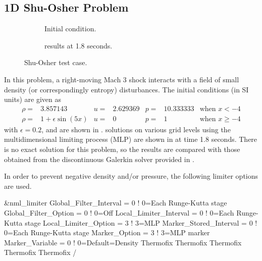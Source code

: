 \subsection{1D Shu-Osher Problem}
\label{SEC:Testcases:ShuOsher}

\begin{figure}[h!tb]
  \begin{centering}
    \begin{subfigure}{3.0in}
      \caption{Initial condition.}
      \label{FIG:ShuOsherStart}
    \end{subfigure}%
    \begin{subfigure}{3.0in}
      \caption{\PO[3] results at 1.8 seconds.}
      \label{FIG:ShuOsherFinal}
    \end{subfigure}
    \caption{Shu-Osher test case.}
    \label{FIG:ShuOsher}
  \end{centering}
\end{figure}

In this problem, a right-moving Mach 3 shock interacts with a field of
small density (or correspondingly entropy) disturbances.
%
The initial conditions (in SI units) are given as
%
\begin{align}
    \rho =& 3.857143
  & u    =& 2.629369
  & p    =& 10.333333
  & \text{when $x < -4$}
  \\
    \rho =& 1 + \epsilon \sin \left( 5 x \right)
  & u    =& 0
  & p    =& 1
  & \text{when $x \geq -4$}
\end{align}
%
with $\epsilon=0.2$, and are shown in .
%
\PO[3] solutions on various grid levels using the
multidimensional limiting process (MLP) are shown in 
at time 1.8 seconds.
%
There is no exact solution for this problem, so the results are compared
with those obtained from the discontinuous Galerkin solver provided in
.

In order to prevent negative density and\slash or pressure, the following
limiter options are used.
\begin{nmldescitem}
&nml_limiter
  Global_Filter_Interval    =  0     ! 0=Each Runge-Kutta stage
  Global_Filter_Option      =  0     ! 0=Off
  Local_Limiter_Interval    =  0     ! 0=Each Runge-Kutta stage
  Local_Limiter_Option      =  3     ! 3=MLP
  Marker_Stored_Interval    =  0     ! 0=Each Runge-Kutta stage
  Marker_Option             =  3     ! 3=MLP marker
  Marker_Variable           =  0     ! 0=Default=Density
  Thermofix%
  Thermofix%
  Thermofix%
  Thermofix%
  Thermofix%
/
\end{nmldescitem}


